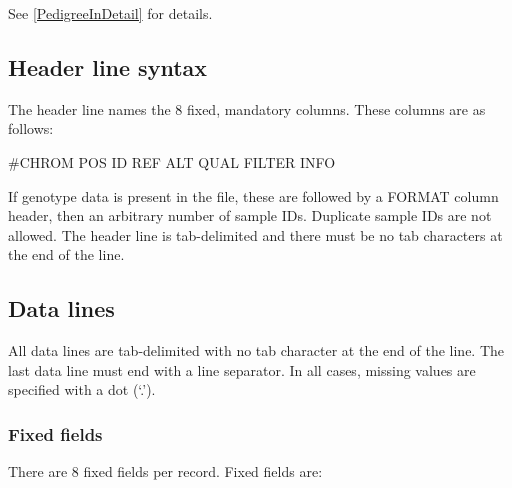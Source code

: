 \documentclass[8pt]{article}
\begin{document}
\noindent See \ref{PedigreeInDetail} for details.


\subsection{Header line syntax}
\label{header-line}
The header line names the 8 fixed, mandatory columns. These columns are as follows:
\begin{center}
       \#CHROM
\qquad POS
\qquad ID
\qquad REF
\qquad ALT
\qquad QUAL
\qquad FILTER
\qquad INFO
\end{center}
\noindent
If genotype data is present in the file, these are followed by a FORMAT column header, then an arbitrary number of sample IDs.
Duplicate sample IDs are not allowed.
The header line is tab-delimited and there must be no tab characters at the end of the line.

\subsection{Data lines}
\label{data-lines}
All data lines are tab-delimited with no tab character at the end of the line.
The last data line must end with a line separator.
In all cases, missing values are specified with a dot (`.').

\subsubsection{Fixed fields}
There are 8 fixed fields per record.
Fixed fields are:
\end{document}
